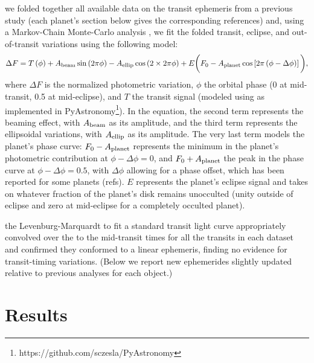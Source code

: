 \documentclass[manuscript]{aastex62}
\begin{document}
we folded together all available data on the transit ephemeris from a previous study (each planet's section below gives the corresponding references) and, using a Markov-Chain Monte-Carlo analysis \citep{}, we fit the folded transit, eclipse, and out-of-transit variations using the following model:
\begin{equation}
    \Delta F = T\left(\phi\right) + A_{\rm beam} \sin\left(2\pi\phi\right) - A_{\rm ellip} \cos\left( 2 \times 2\pi\phi \right) + E \bigg( F_{\rm 0} - A_{\rm planet} \cos\left[ 2\pi\left( \phi - \Delta \phi \right) \right] \bigg), \label{eqn:photometric_model}
\end{equation}
where $\Delta F$ is the normalized photometric variation, $\phi$ the orbital phase (0 at mid-transit, 0.5 at mid-eclipse), and $T$ the transit signal (modeled using \citealt{2002ApJ...580L.171M} as implemented in PyAstronomy\footnote{https://github.com/sczesla/PyAstronomy}). In the equation, the second term represents the beaming effect, with $A_{\rm beam}$ as its amplitude, and the third term represents the ellipsoidal variations, with $A_{\rm ellip}$ as its amplitude. The very last term models the planet's phase curve: $F_{\rm 0} - A_{\rm planet}$ represents the minimum in the planet's photometric contribution at $\phi - \Delta \phi = 0$, and $F_{\rm 0} + A_{\rm planet}$ the peak in the phase curve at $\phi - \Delta \phi = 0.5$, with $\Delta \phi$ allowing for a phase offset, which has been reported for some planets (refs). $E$ represents the planet's eclipse signal and takes on whatever fraction of the planet's disk remains unocculted (unity outside of eclipse and zero at mid-eclipse for a completely occulted planet).

the Levenburg-Marquardt to fit a standard transit light curve \citep{2002ApJ...580L.171M} appropriately convolved over the to the mid-transit times for all the transits in each dataset and confirmed they conformed to a linear ephemeris, finding no evidence for transit-timing variations. (Below we report new ephemerides slightly updated relative to previous analyses for each object.) 

\section{Results}
\end{document}
